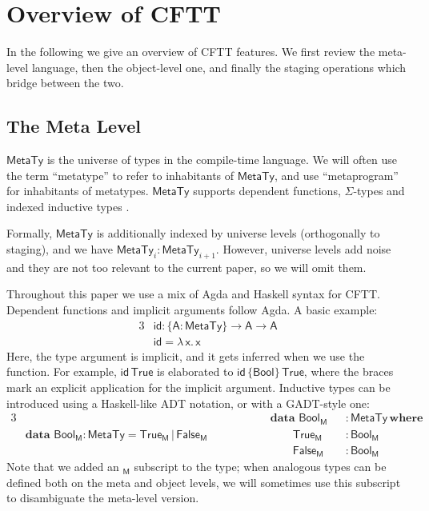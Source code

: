 \documentclass[acmsmall,screen]{acmart}
\newcommand{\mit}[1]{{\mathsf{#1}}}
\newcommand{\msf}[1]{{\mathsf{#1}}}
\newcommand{\mbf}[1]{{\mathbf{#1}}}
\newcommand{\bs}[1]{\boldsymbol{#1}}
\newcommand{\ind}{\hspace{1em}}
\newcommand{\lam}{\lambda\,}
\newcommand{\data}{\mbf{data}\,}
\newcommand{\where}{\mbf{where}}
\newcommand{\M}{\msf{M}}
\newcommand{\vA}{\mathsf{A}}
\newcommand{\vx}{\mathsf{x}}
\newcommand{\Bool}{\msf{Bool}}
\newcommand{\MTy}{\msf{MetaTy}}
\newcommand{\True}{\msf{True}}
\newcommand{\False}{\msf{False}}
\theoremstyle{remark}
\newcommand{\id}{\mit{id}}
\begin{document}
\section{Overview of CFTT}\label{sec:overview-of-cftt}

In the following we give an overview of CFTT features. We first review the
meta-level language, then the object-level one, and finally the staging
operations which bridge between the two.

\subsection{The Meta Level}\label{sec:the-meta-level}

$\bs{\MTy}$ is the universe of types in the compile-time language. We will often
use the term ``metatype'' to refer to inhabitants of $\MTy$, and use
``metaprogram'' for inhabitants of metatypes. $\MTy$ supports dependent
functions, $\Sigma$-types and indexed inductive types \cite{inductivefamilies}.

Formally, $\MTy$ is additionally indexed by universe levels (orthogonally to
staging), and we have $\MTy_i : \MTy_{i+1}$. However, universe levels add noise
and they are not too relevant to the current paper, so we will omit them.

Throughout this paper we use a mix of Agda and Haskell syntax for
CFTT. Dependent functions and implicit arguments follow Agda. A basic example:
\begin{alignat*}{3}
  &\id : \{\vA : \MTy\} \to \vA \to \vA\\
  &\id = \lam \vx.\, \vx
\end{alignat*}
Here, the type argument is implicit, and it gets inferred when we use the
function. For example, $\id\,\True$ is elaborated to $\id\,\{\Bool\}\,\True$,
where the braces mark an explicit application for the implicit argument.
Inductive types can be introduced using a Haskell-like ADT notation, or with a
GADT-style one:
\begin{alignat*}{3}
  &                                           &&\hspace{4em}\data\,\Bool_\M &&: \MTy\,\where\\
  & \data\,\Bool_\M : \MTy = \True_\M\,|\,\False_\M &&\hspace{4em}\ind\ind \True_\M &&: \Bool_\M\\
  &                                           &&\hspace{4em}\ind\ind \False_\M &&: \Bool_\M
\end{alignat*}
Note that we added an $_\M$ subscript to the type; when analogous types can be
defined both on the meta and object levels, we will sometimes use this subscript
to disambiguate the meta-level version.
\end{document}
